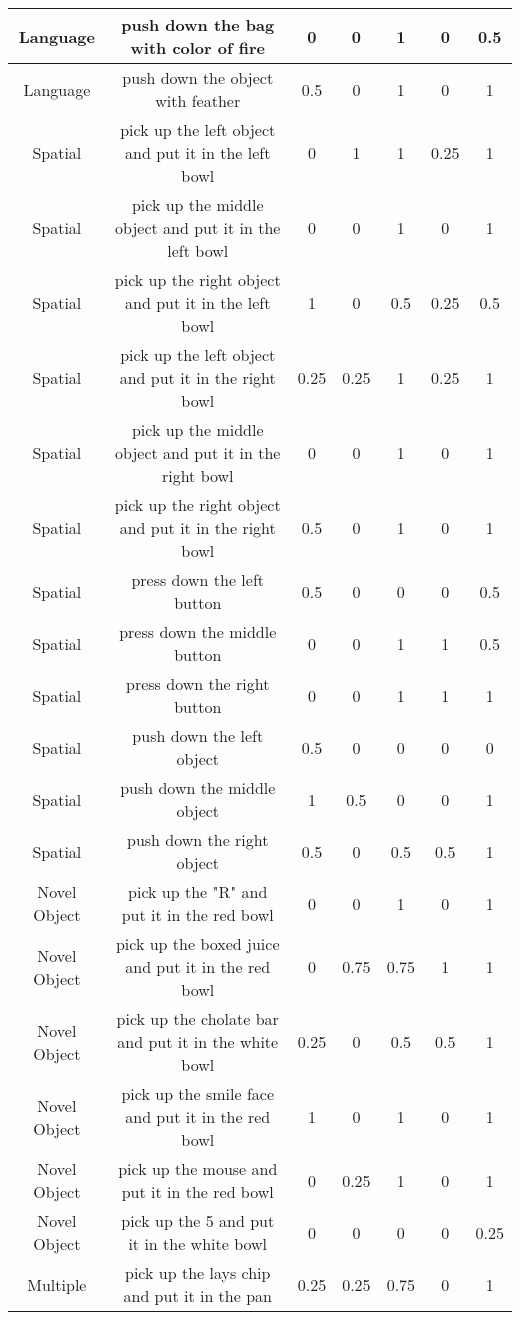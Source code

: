 \begin{table}
{\begin{tabular}{|c|c|c|c|c|c|c|}
Language & push down the bag with color of fire & 0 & 0 & 1 & 0 & 0.5 \\ \hline
Language & push down the object with feather & 0.5 & 0 & 1 & 0 & 1 \\ \hline
Spatial & pick up the left object and put it in the left bowl & 0 & 1 & 1 & 0.25 & 1 \\ \hline
Spatial & pick up the middle object and put it in the left bowl & 0 & 0 & 1 & 0 & 1 \\ \hline
Spatial & pick up the right object and put it in the left bowl & 1 & 0 & 0.5 & 0.25 & 0.5 \\ \hline
Spatial & pick up the left object and put it in the right bowl & 0.25 & 0.25 & 1 & 0.25 & 1 \\ \hline
Spatial & pick up the middle object and put it in the right bowl & 0 & 0 & 1 & 0 & 1 \\ \hline
Spatial & pick up the right object and put it in the right bowl & 0.5 & 0 & 1 & 0 & 1 \\ \hline
Spatial & press down the left button & 0.5 & 0 & 0 & 0 & 0.5 \\ \hline
Spatial & press down the middle button & 0 & 0 & 1 & 1 & 0.5 \\ \hline
Spatial & press down the right button & 0 & 0 & 1 & 1 & 1 \\ \hline
Spatial & push down the left object & 0.5 & 0 & 0 & 0 & 0 \\ \hline
Spatial & push down the middle object & 1 & 0.5 & 0 & 0 & 1 \\ \hline
Spatial & push down the right object & 0.5 & 0 & 0.5 & 0.5 & 1 \\ \hline
Novel Object & pick up the "R" and put it in the red bowl & 0 & 0 & 1 & 0 & 1 \\ \hline
Novel Object & pick up the boxed juice and put it in the red bowl & 0 & 0.75 & 0.75 & 1 & 1 \\ \hline
Novel Object & pick up the cholate bar and put it in the white bowl & 0.25 & 0 & 0.5 & 0.5 & 1 \\ \hline
Novel Object & pick up the smile face and put it in the red bowl & 1 & 0 & 1 & 0 & 1 \\ \hline
Novel Object & pick up the mouse and put it in the red bowl & 0 & 0.25 & 1 & 0 & 1 \\ \hline
Novel Object & pick up the 5 and put it in the white bowl & 0 & 0 & 0 & 0 & 0.25 \\ \hline
Multiple & pick up the lays chip and put it in the pan & 0.25 & 0.25 & 0.75 & 0 & 1 \\ \hline

\end{tabular}}
\end{table}
